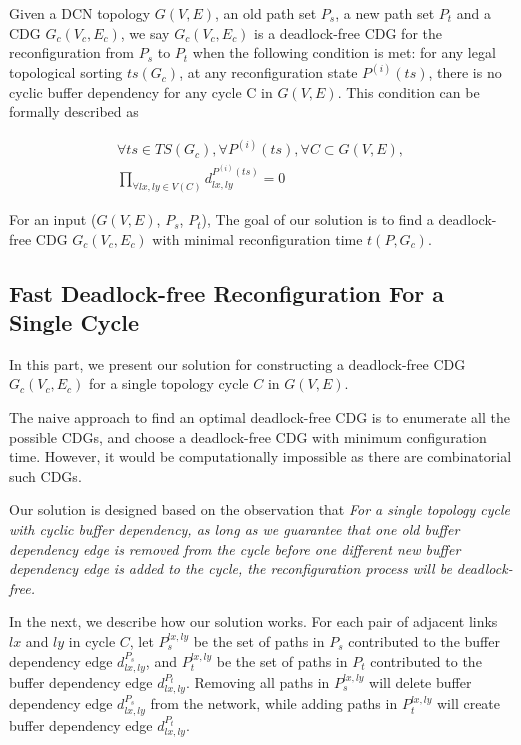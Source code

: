 
Given a DCN topology $G(V,E)$, an old path set $P_s$, a new path set $P_t$ and a CDG $G_c(V_c,E_c)$,  we say $G_c(V_c,E_c)$ is a deadlock-free CDG for the  reconfiguration from $P_s$ to $P_t$ when the following condition is met: for any legal topological sorting $ts(G_c)$, at any reconfiguration state ${P^{(i)}(ts)}$, there is no cyclic buffer dependency for any cycle C in $G(V,E)$. This condition can be formally described as

\begin{equation}  \label{eq:2}
\begin{split}
 \forall ts \in TS(G_c), \forall P^{(i)}(ts), \forall C \subset G(V,E), \\
 \displaystyle{\prod\limits_{\forall lx, ly \in V(C)} d_{lx,ly}^{P^{(i)}(ts)} =0}
 \end{split}
\end{equation} 

For an input ($G(V,E)$, $P_s$, $P_t$), The goal of our solution is to find a deadlock-free CDG $G_c(V_c,E_c)$ with minimal reconfiguration time $t(P, G_c)$.

\subsection{Fast Deadlock-free Reconfiguration For a Single Cycle}\label{subsec:dfrforsc}



In this part, we present our solution for constructing a deadlock-free CDG $G_c(V_c,E_c)$ for a single topology cycle $C$ in $G(V,E)$. 

The naive approach to find an optimal deadlock-free CDG is to enumerate all the possible CDGs, and choose a deadlock-free CDG with minimum configuration time. However, it would be computationally impossible as there are combinatorial such CDGs. 

Our solution is designed based on the observation that \textit{For a single topology cycle with cyclic buffer dependency, as long as we guarantee that one old buffer dependency edge is removed from the cycle before one different new buffer dependency edge is added to the cycle, the reconfiguration process will be deadlock-free.} 

In the next, we describe how our solution works. For each pair of adjacent links $lx$ and $ly$ in cycle $C$, let $P_s^{lx,ly}$ be the set of paths in $P_s$ contributed to the buffer dependency edge $d_{lx,ly}^{P_s}$, and $P_t^{lx,ly}$ be the set of paths in $P_t$ contributed to the buffer dependency edge $d_{lx,ly}^{P_t}$. Removing all paths in $P_s^{lx,ly}$ will delete buffer dependency edge $d_{lx,ly}^{P_s}$ from the network, while adding paths in $P_t^{lx,ly}$ will create buffer dependency edge $d_{lx,ly}^{P_t}$.


